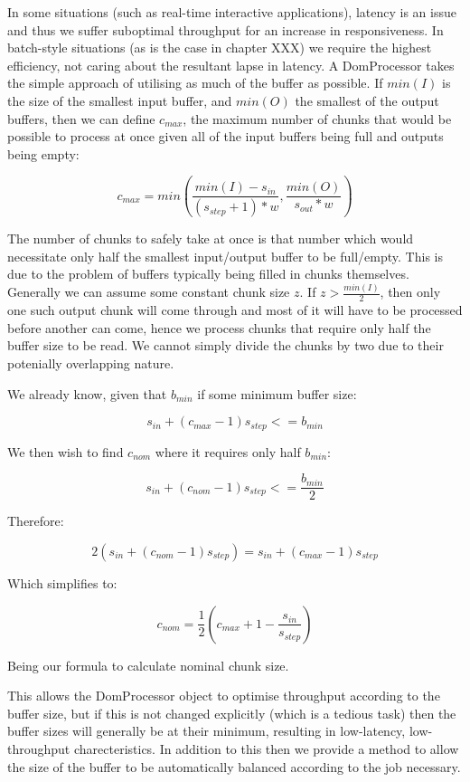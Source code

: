 In some situations (such as real-time interactive applications), latency is an issue and thus we suffer suboptimal throughput for an increase in responsiveness. In batch-style situations (as is the case in chapter XXX) we require the highest efficiency, not caring about the resultant lapse in latency. A DomProcessor takes the simple approach of utilising as much of the buffer as possible. If $min(I)$ is the size of the smallest input buffer, and $min(O)$ the smallest of the output buffers, then we can define $c_{max}$, the maximum number of chunks that would be possible to process at once given all of the input buffers being full and outputs being empty:

$$
c_{max} = min(\frac{min(I) - s_{in}}{(s_{step} + 1) * w}, \frac{min(O)}{s_{out} * w})
$$

The number of chunks to safely take at once is that number which would necessitate only half the smallest input/output buffer to be full/empty. This is due to the problem of buffers typically being filled in chunks themselves. Generally we can assume some constant chunk size $z$. If $z > \frac{min(I)}{2}$, then only one such output chunk will come through and most of it will have to be processed before another can come, hence we process chunks that require only half the buffer size to be read. We cannot simply divide the chunks by two due to their potenially overlapping nature.

We already know, given that $b_{min}$ if some minimum buffer size:

$$
s_{in} + (c_{max}-1)s_{step} <= b_{min}
$$

We then wish to find $c_{nom}$ where it requires only half $b_{min}$:

$$
s_{in} + (c_{nom}-1)s_{step} <= \frac{b_{min}}{2}
$$

Therefore:

$$
2(s_{in} + (c_{nom}-1)s_{step}) = s_{in} + (c_{max}-1)s_{step}
$$

Which simplifies to:

$$
c_{nom} = \frac{1}{2}(c_{max} + 1 - \frac{s_{in}}{s_{step}})
$$

Being our formula to calculate nominal chunk size.

This allows the DomProcessor object to optimise throughput according to the buffer size, but if this is not changed explicitly (which is a tedious task) then the buffer sizes will generally be at their minimum, resulting in low-latency, low-throughput charecteristics. In addition to this then we provide a method to allow the size of the buffer to be automatically balanced according to the job necessary.

